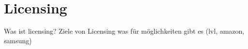 \section{Licensing}\label{section:licensing}
Was ist licensing?\newline
Ziele von Licensing\newline
was für möglichkeiten gibt es (lvl, amazon, samsung)\newline
